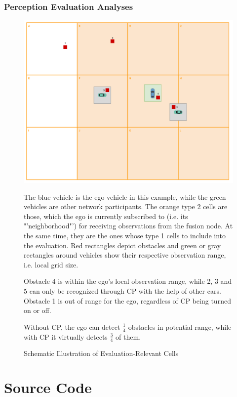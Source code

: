\subsection{Perception Evaluation Analyses}
\label{subsec:appendix:texts:evaluation:perception_relevant_analyses}
\begin{figure}[H]
	\includegraphics[width=1\linewidth]{98_images/grid_evaluation}
	\caption{Schematic Illustration of Evaluation-Relevant Cells}
	\label{fig:eval_relevant_cells}
	\medskip
	\small
	The blue vehicle is the ego vehicle in this example, while the green vehicles are other network participants. The orange type 2 cells are those, which the ego is currently subscribed to (i.e. its "'neighborhood"') for receiving observations from the fusion node. At the same time, they are the ones whose type 1 cells to include into the evaluation. Red rectangles depict obstacles and green or gray rectangles around vehicles show their respective observation range, i.e. local grid size.
	
	Obstacle 4 is within the ego's local observation range, while 2, 3 and 5 can only be recognized through CP with the help of other cars. Obstacle 1 is out of range for the ego, regardless of CP being turned on or off.
	
	Without CP, the ego can detect $\frac{1}{4}$ obstacles in potential range, while with CP it virtually detects $\frac{3}{4}$ of them.
\end{figure}

\chapter{Source Code}
\label{appendix:source_code}

